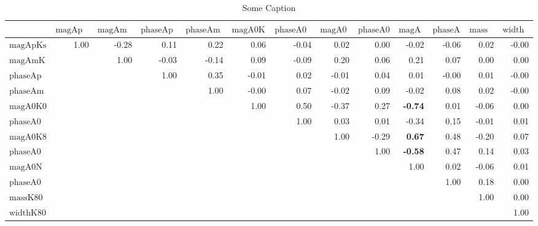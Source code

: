 \small
\renewcommand*{\arraystretch}{1.}
\renewcommand{\pm}{\ensuremath{\oldpm} }
\begin{sidewaystable}[h]
\begin{center}
\begin{tabular}{@{}|l|r|r|r|r|r|r|r|r|r|r|r|r|@{}}
\hline
 & $\text{magApKst892}$ & $\text{magAmKst892}$ & $\text{phaseApKst892}$ & $\text{phaseAmKst892}$ & $\text{magA0K01430}$ & $\text{phaseA0K01430}$ & $\text{magA0K800}$ & $\text{phaseA0K800}$ & $\text{magA0NR}$ & $\text{phaseA0NR}$ & $\text{massK800}$ & $\text{widthK800}$\\ \hline \hline
$\text{magApKst892}$ & 1.00 & -0.28 & 0.11 & 0.22 & 0.06 & -0.04 & 0.02 & 0.00 & -0.02 & -0.06 & 0.02 & -0.00 \\
$\text{magAmKst892}$ &  & 1.00 & -0.03 & -0.14 & 0.09 & -0.09 & 0.20 & 0.06 & 0.21 & 0.07 & 0.00 & 0.00 \\
$\text{phaseApKst892}$ &  &  & 1.00 & 0.35 & -0.01 & 0.02 & -0.01 & 0.04 & 0.01 & -0.00 & 0.01 & -0.00 \\
$\text{phaseAmKst892}$ &  &  &  & 1.00 & -0.00 & 0.07 & -0.02 & 0.09 & -0.02 & 0.08 & 0.02 & -0.00 \\
$\text{magA0K01430}$ &  &  &  &  & 1.00 & 0.50 & -0.37 & 0.27 & \bf{-0.74} & 0.01 & -0.06 & 0.00 \\
$\text{phaseA0K01430}$ &  &  &  &  &  & 1.00 & 0.03 & 0.01 & -0.34 & 0.15 & -0.01 & 0.01 \\
$\text{magA0K800}$ &  &  &  &  &  &  & 1.00 & -0.29 & \bf{0.67} & 0.48 & -0.20 & 0.07 \\
$\text{phaseA0K800}$ &  &  &  &  &  &  &  & 1.00 & \bf{-0.58} & 0.47 & 0.14 & 0.03 \\
$\text{magA0NR}$ &  &  &  &  &  &  &  &  & 1.00 & 0.02 & -0.06 & 0.01 \\
$\text{phaseA0NR}$ &  &  &  &  &  &  &  &  &  & 1.00 & 0.18 & 0.00 \\
$\text{massK800}$ &  &  &  &  &  &  &  &  &  &  & 1.00 & 0.00 \\
$\text{widthK800}$ &  &  &  &  &  &  &  &  &  &  &  & 1.00 \\
\hline
\end{tabular}
\caption{Some Caption}
\label{thisTable}
\end{center}
\end{sidewaystable}
\renewcommand{\pm}{\oldpm}
\restoregeometry

